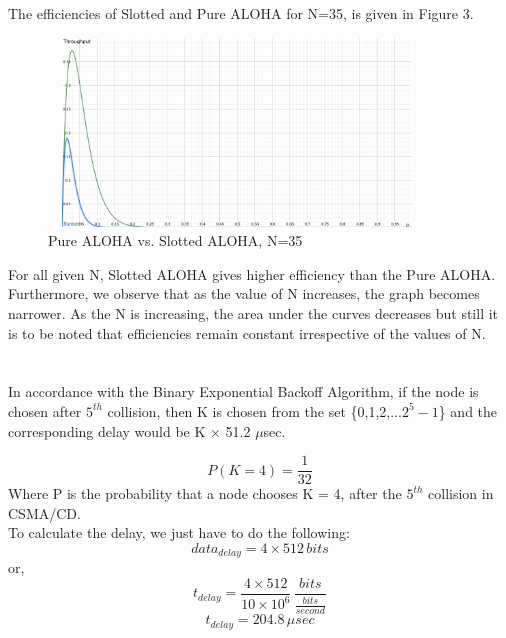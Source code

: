 \documentclass[12pt]{article}
\begin{document}
The efficiencies of Slotted and Pure ALOHA for N=35, is given in Figure 3.
\begin{figure}
    \centering
    \includegraphics[width=10cm, height=5cm]{N_35.png}
    \caption{Pure ALOHA vs. Slotted ALOHA, N=35}
\end{figure}


For all given N, Slotted ALOHA gives higher efficiency than the Pure ALOHA. Furthermore, we observe that as the value of N increases, the graph becomes narrower. As the N is increasing, the area under the curves decreases but still it is to be noted that efficiencies remain constant irrespective of the values of N.

\section{}
In accordance with the Binary Exponential Backoff Algorithm, if the node is chosen after $5^{th}$ collision, then K is chosen from the set \{0,1,2,...$2^5-1$\} and the corresponding delay would be K $\times$ 51.2 $\mu$sec.

\begin{equation*}
    P(K = 4) = \frac{1}{32}
\end{equation*}
Where P is the probability that a node chooses K = 4, after the $5^{th}$ collision in CSMA/CD. \\
To calculate the delay, we just have to do the following:
\begin{equation*}
    data_{delay} = 4 \times 512 \, bits   
\end{equation*}
or,
\begin{equation*}
    t_{delay} = \frac{4 \times 512}{10 \times 10^6} \, \frac{bits}{\frac{bits}{second}}   
\end{equation*}
\begin{equation*}
    t_{delay} = 204.8 \, \mu sec
\end{equation*}
\end{document}
